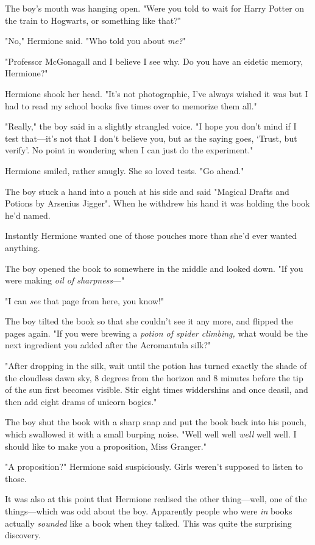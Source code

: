 The boy's mouth was hanging open. "Were you told to wait for Harry Potter on
the train to Hogwarts, or something like that?"

"No," Hermione said. "Who told you about \emph{me?}"

"Professor McGonagall and I believe I see why. Do you have an eidetic memory,
Hermione?"

Hermione shook her head. "It's not photographic, I've always wished it was but
I had to read my school books five times over to memorize them all."

"Really," the boy said in a slightly strangled voice. "I hope you don't mind if
I test that---it's not that I don't believe you, but as the saying goes,
`Trust, but verify'. No point in wondering when I can just do the experiment."

Hermione smiled, rather smugly. She so loved tests. "Go ahead."

The boy stuck a hand into a pouch at his side and said "Magical Drafts and
Potions by Arsenius Jigger". When he withdrew his hand it was holding the book
he'd named.

Instantly Hermione wanted one of those pouches more than she'd ever wanted
anything.

The boy opened the book to somewhere in the middle and looked down. "If you
were making \emph{oil of sharpness}---"

"I can \emph{see} that page from here, you know!"

The boy tilted the book so that she couldn't see it any more, and flipped the
pages again. "If you were brewing a \emph{potion of spider climbing,} what
would be the next ingredient you added after the Acromantula silk?"

"After dropping in the silk, wait until the potion has turned exactly the shade
of the cloudless dawn sky, 8 degrees from the horizon and 8 minutes before the
tip of the sun first becomes visible. Stir eight times widdershins and once
deasil, and then add eight drams of unicorn bogies."

The boy shut the book with a sharp snap and put the book back into his pouch,
which swallowed it with a small burping noise. "Well well well \emph{well} well
well. I should like to make you a proposition, Miss Granger."

"A proposition?" Hermione said suspiciously. Girls weren't supposed to listen
to those.

It was also at this point that Hermione realised the other thing---well, one of
the things---which was odd about the boy. Apparently people who were \emph{in}
books actually \emph{sounded} like a book when they talked. This was quite the
surprising discovery.

